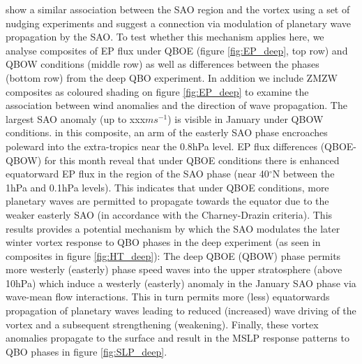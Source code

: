 \cite{gray2020} show a similar association between the SAO region and the vortex using a set of nudging experiments and suggest a connection via modulation of planetary wave propagation by the SAO. To test whether this mechanism applies here, we analyse composites of EP flux under QBOE (figure \ref{fig:EP_deep}, top row) and QBOW conditions (middle row) as well as differences between the phases (bottom row) from the deep QBO experiment. In addition we include ZMZW composites as coloured shading on figure \ref{fig:EP_deep} to examine the association between wind anomalies and the direction of wave propagation. The largest SAO anomaly (up to xxx$ms^{-1}$) is visible in January under QBOW conditions. in this composite, an arm of the easterly SAO phase encroaches poleward into the extra-tropics near the 0.8hPa level. EP flux differences (QBOE-QBOW) for this month reveal that under QBOE conditions there is enhanced equatorward EP flux in the region of the SAO phase (near 40$^\circ$N between the 1hPa and 0.1hPa levels). This indicates that under QBOE conditions, more planetary waves are permitted to propagate towards the equator due to the weaker easterly SAO (in accordance with the Charney-Drazin criteria). This results provides a potential mechanism by which the SAO modulates the later winter vortex response to QBO phases in the deep experiment (as seen in composites in figure \ref{fig:HT_deep}): The deep QBOE (QBOW) phase permits more westerly (easterly) phase speed waves into the upper stratosphere (above 10hPa) which induce a westerly (easterly) anomaly in the January SAO phase via wave-mean flow interactions. This in turn permits more (less) equatorwards propagation of planetary waves leading to reduced (increased) wave driving of the vortex and a subsequent strengthening (weakening). Finally, these vortex anomalies propagate to the surface and result in the MSLP response patterns to QBO phases in figure \ref{fig:SLP_deep}.

